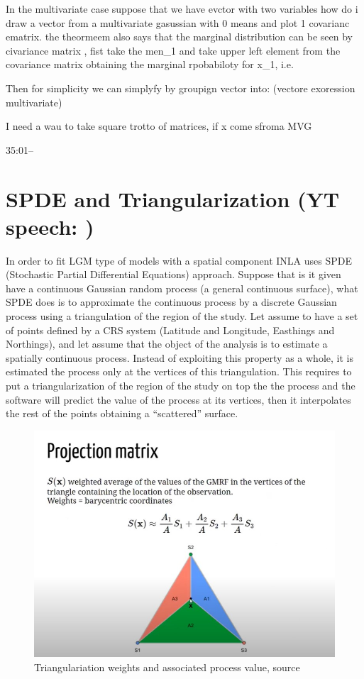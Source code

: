 \documentclass[
  12pt,
  a4paper,
  oneside]{book}
\theoremstyle{definition}
\theoremstyle{definition}
\theoremstyle{definition}
\theoremstyle{remark}
\begin{document}
In the multivariate case suppose that we have evctor with two variables how do i draw a vector from a multivariate gasussian with 0 means and plot 1 covarianc ematrix. the theormeem also says that the marginal distribution can be seen by civariance matrix , fist take the men\_1 and take upper left element from the covariance matrix obtaining the marginal rpobabiloty for x\_1, i.e.

Then for simplicity we can simplyfy by groupign vector into:
(vectore exoression multivariate)

I need a wau to take square trotto of matrices, if x come sfroma MVG

35:01--

\hypertarget{triangular}{%
\section{\texorpdfstring{SPDE and Triangularization (YT speech: \citet{YT:paumoraga})}{SPDE and Triangularization (YT speech: @YT:paumoraga)}}\label{triangular}}

In order to fit LGM type of models with a spatial component INLA uses SPDE (Stochastic Partial Differential Equations) approach.
Suppose that is it given have a continuous Gaussian random process (a general continuous surface), what SPDE does is to approximate the continuous process by a discrete Gaussian process using a triangulation of the region of the study. Let assume to have a set of points defined by a CRS system (Latitude and Longitude, Easthings and Northings), and let assume that the object of the analysis is to estimate a spatially continuous process. Instead of exploiting this property as a whole, it is estimated the process only at the vertices of this triangulation. This requires to put a triangularization of the region of the study on top the the process and the software will predict the value of the process at its vertices, then it interpolates the rest of the points obtaining a ``scattered'' surface.

\begin{figure}
\centering
\includegraphics{appendix_images/appendix_triangularization.jpg}
\caption{\label{fig:triang}Triangulariation weights and associated process value, \citet{YT:paumoraga} source}
\end{figure}
\end{document}
